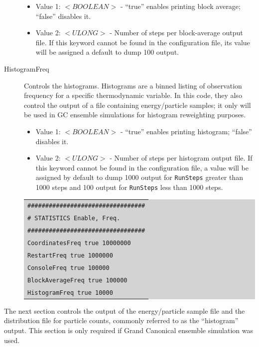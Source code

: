 \begin{description}
	\begin{itemize}
	\item Value 1: $<BOOLEAN>$ - ``true'' enables printing block average; ``false'' disables it.
	\item Value 2: $<ULONG>$ - Number of steps per block-average output file. If this keyword cannot be found in the configuration file, its value will be assigned a default to dump 100 output.
	\end{itemize}
\item [HistogramFreq] Controls the histograms. Histograms are a binned listing of observation frequency for a specific thermodynamic variable.  In this code, they also control the output of a file containing energy/particle samples; it only will be used in GC ensemble simulations for histogram reweighting purposes.
	\begin{itemize}
	\item Value 1: $<BOOLEAN>$ - ``true'' enables printing histogram; ``false'' disables it.
	\item Value 2: $<ULONG>$ - Number of steps per histogram output file. If this keyword cannot be found in the configuration file, a value will be assigned by default to dump 1000 output for \texttt{RunSteps} greater than 1000 steps and 100 output for \texttt{RunSteps} less than 1000 steps.
	\end{itemize}
	\colorbox{lightgray}{
	\begin{tabular}{l}
	\texttt{\#\#\#\#\#\#\#\#\#\#\#\#\#\#\#\#\#\#\#\#\#\#\#\#\#\#\#\#\#\#\#\#\#}\\
	\texttt{\#  STATISTICS  Enable,  Freq.}\\
	\texttt{\#\#\#\#\#\#\#\#\#\#\#\#\#\#\#\#\#\#\#\#\#\#\#\#\#\#\#\#\#\#\#\#\#}\\
	\texttt{CoordinatesFreq   	 true   10000000}\\
	\texttt{RestartFreq  	  	 true   1000000}\\
	\texttt{ConsoleFreq       	 true   100000}\\
	\texttt{BlockAverageFreq  	 true   100000}\\
	\texttt{HistogramFreq  	 true   10000}\\
	\end{tabular}}
\end{description}
The next section controls the output of the energy/particle sample file and the distribution file for particle counts, commonly referred to as the ``histogram'' output. This section is only required if Grand Canonical ensemble simulation was used.
